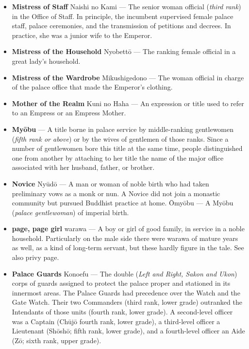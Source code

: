 \documentclass{article}
\begin{document}
\begin{multicols}{2}
\begin{small}
\begin{itemize}[
				label=,
				leftmargin=0em,
				rightmargin=-1.5em,
				itemindent=-2em,
			]
			\item \textbf{Mistress of Staff} Naishi no Kami --- The senior woman official (\textit{third rank}) in the Office of Staff. In principle, the incumbent supervised female palace staff, palace ceremonies, and the transmission of petitions and decrees. In practice, she was a junior wife to the Emperor.

			\item \textbf{Mistress of the Household} Nyobettō --- The ranking female official in a great lady's household.

			\item \textbf{Mistress of the Wardrobe} Mikushigedono --- The woman official in charge of the palace office that made the Emperor's clothing.

			\item \textbf{Mother of the Realm} Kuni no Haha --- An expression or title used to refer to an Empress or an Empress Mother.

			\item \textbf{Myōbu} --- A title borne in palace service by middle-ranking gentlewomen (\textit{fifth rank or above}) or by the wives of gentlemen of those ranks. Since a number of gentlewomen bore this title at the same time, people distinguished one from another by attaching to her title the name of the major office associated with her husband, father, or brother.

			\item \textbf{Novice} Nyūdō --- A man or woman of noble birth who had taken preliminary vows as a monk or nun. A Novice did not join a monastic community but pursued Buddhist practice at home.
			      Ōmyōbu --- A Myōbu (\textit{palace gentlewoman}) of imperial birth.

			\item \textbf{page, page girl} warawa --- A boy or girl of good family, in service in a noble household. Particularly on the male side there were warawa of mature years as well, as a kind of long-term servant, but these hardly figure in the tale. See also privy page.

			\item \textbf{Palace Guards} Konoefu --- The double (\textit{Left and Right, Sakon and Ukon}) corps of guards assigned to protect the palace proper and stationed in its innermost areas. The Palace Guards had precedence over the Watch and the Gate Watch. Their two Commanders (third rank, lower grade) outranked the Intendants of those units (fourth rank, lower grade). A second-level officer was a Captain (Chūjō fourth rank, lower grade), a third-level officer a Lieutenant (Shōshō; fifth rank, lower grade), and a fourth-level officer an Aide (Zō; sixth rank, upper grade).


\end{itemize}
\end{small}
\end{multicols}
\end{document}
